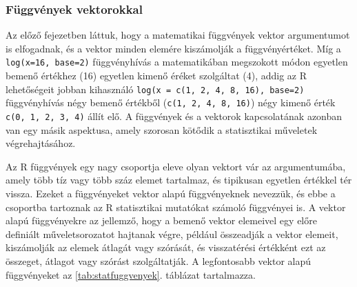 \documentclass[
]{book}
\begin{document}
\hypertarget{fuxfcggvuxe9nyek-vektorokkal}{%
\subsubsection{Függvények vektorokkal}\label{fuxfcggvuxe9nyek-vektorokkal}}

Az előző fejezetben láttuk, hogy a matematikai függvények vektor argumentumot is elfogadnak, és a vektor minden elemére kiszámolják a függvényértéket. Míg a \texttt{log(x=16,\ base=2)} függvényhívás a matematikában megszokott módon egyetlen bemenő értékhez (16) egyetlen kimenő éréket szolgáltat (4), addig az R lehetőségeit jobban kihasználó \texttt{log(x\ =\ c(1,\ 2,\ 4,\ 8,\ 16),\ base=2)} függvényhívás négy bemenő értékből (\texttt{c(1,\ 2,\ 4,\ 8,\ 16)}) négy kimenő érték \texttt{c(0,\ 1,\ 2,\ 3,\ 4)} állít elő. A függvények és a vektorok kapcsolatának azonban van egy másik aspektusa, amely szorosan kötődik a statisztikai műveletek végrehajtásához.

Az R függvények egy nagy csoportja eleve olyan vektort vár az argumentumába, amely több tíz vagy több száz elemet tartalmaz, és tipikusan egyetlen értékkel tér vissza. Ezeket a függvényeket vektor alapú függvényeknek nevezzük, és ebbe a csoportba tartoznak az R statisztikai mutatókat számoló függvényei is. A vektor alapú függvényekre az jellemző, hogy a bemenő vektor elemeivel egy előre definiált műveletsorozatot hajtanak végre, például összeadják a vektor elemeit, kiszámolják az elemek átlagát vagy szórását, és visszatérési értékként ezt az összeget, átlagot vagy szórást szolgáltatják. A legfontosabb vektor alapú függvényeket az \ref{tab:statfuggvenyek}. táblázat tartalmazza.
\end{document}
